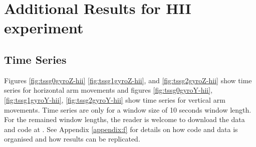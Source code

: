 \chapter{Additional Results for HII experiment} \label{appendix:d}


\graphicspath{{figs/appendixD/PDF/}}



\section{Time Series} \label{appendix:d:ts}
Figures \ref{fig:tssg0gyroZ-hii} \ref{fig:tssg1gyroZ-hii}, and \ref{fig:tssg2gyroZ-hii}
show time series for horizontal arm movements 
and figures \ref{fig:tssg0gyroY-hii}, \ref{fig:tssg1gyroY-hii},
\ref{fig:tssg2gyroY-hii}
show time series for vertical arm movements.
Time series are only for a window size of 10 seconds window length.
For the remained window lengths, 
the reader is welcome to download the data and code at \cite{xochicale2018}.
See Appendix \ref{appendix:f}
for details on how code and data 
is organised and how results can be replicated. 


